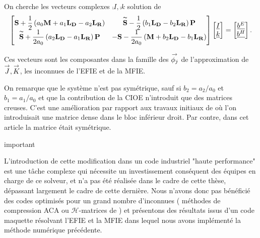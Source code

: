   \begin{prop}
    \label{prop:form_int:ci3}
    On cherche les vecteurs complexes \(\comp{I},\comp{k}\) solution de
    \begin{equation*}
      \begin{bmatrix}
        \mathbf{S} +  \dfrac{1}{2} \left(a_0 \mathbf{M} + a_1 \mathbf{L_D} - a_2 \mathbf{L_R}\right) & \mathbf{\overset{\thicksim}{S}} - \dfrac{1}{2}\left(b_1 \mathbf{L_D} - b_2 \mathbf{L_R} \right)\mathbf{P} \\
        \mathbf{\overset{\thicksim}{S}} + \dfrac{1}{2a_0}\left( a_2 \mathbf{L_D} - a_1 \mathbf{L_R} \right)\mathbf{P} & -\mathbf{S} - \dfrac{1}{2a_0}\left(\mathbf{M} + b_2 \mathbf{L_D} - b_1 \mathbf{L_R} \right)
      \end{bmatrix}
      \begin{bmatrix}
        {\underline{I}}\\
        {\underline{k}}
      \end{bmatrix}
      =
      \begin{bmatrix}
        {\underline{b^E}}\\
        {\underline{b^H}}
      \end{bmatrix}.
    \end{equation*}

    Ces vecteurs sont les composantes dans la famille des \({\overset{\rightarrow}{\phi_j}}\) de l'approximation de \({\overset{\rightarrow}{J}},{\overset{\rightarrow}{K}}\), les inconnues de l'EFIE et de la MFIE.
  \end{prop}

  On remarque que le système n'est pas symétrique, sauf si \(b_2=a_2/a_0\) et \(b_1=a_1/a_0\) et que la contribution de la CIOE n'introduit que des matrices creuses. 
  C'est une amélioration par rapport aux travaux initiaux de \cite{stupfel_implementation_2015} où l'on introduisait une matrice dense dans le bloc inférieur droit. 
  Par contre, dans cet article la matrice était symétrique.
\begin{REM}
  important
\end{REM} 
  
  L'introduction de cette modification dans un code industriel "haute performance" est une tâche complexe qui nécessite un investissement conséquent des équipes en charge de ce solveur, et n'a pas été réalisée dans le cadre de cette thèse, dépassant largement le cadre de cette dernière.
  Nous n'avons donc pas bénéficié des codes optimisés pour un grand nombre d'inconnues ( méthodes de compression ACA ou \(\mathcal{H}\)-matrices de \cite{lize_resolution_2014} ) et présentons des résultats issus d'un code maquette résolvant l'EFIE et la MFIE dans lequel nous avons implémenté la méthode numérique précédente.